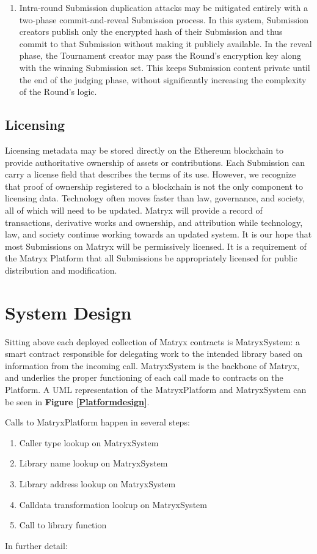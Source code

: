 \documentclass[a4paper, 10pt, conference]{ieeeconf}      %
\begin{document}
\begin{enumerate}
\item Intra-round Submission duplication attacks may be mitigated entirely with a two-phase commit-and-reveal Submission process. 
In this system, Submission creators publish only the encrypted hash of their Submission and thus commit to that Submission without making it publicly available.
In the reveal phase, the Tournament creator may pass the Round's encryption key along with the winning Submission set.
This keeps Submission content private until the end of the judging phase, without significantly increasing the complexity of the Round's logic.
\end{enumerate}

\subsection{Licensing}\label{licensing}
Licensing metadata may be stored directly on the Ethereum blockchain to provide authoritative ownership of assets or contributions. 
Each Submission can carry a license field that describes the terms of its use. 
However, we recognize that proof of ownership registered to a blockchain is not the only component to licensing data. 
Technology often moves faster than law, governance, and society, all of which will need to be updated. 
Matryx will provide a record of transactions, derivative works and ownership, and attribution while technology, law, and society continue working towards an updated system. 
It is our hope that most Submissions on Matryx will be permissively licensed. 
It is a requirement of the Matryx Platform that all Submissions be appropriately licensed for public distribution and modification.

\section{System Design}\label{systemdesign}

Sitting above each deployed collection of Matryx contracts is MatryxSystem: a smart contract responsible for delegating work to the intended library based on information from the incoming call. 
MatryxSystem is the backbone of Matryx, and underlies the proper functioning of each call made to contracts on the Platform. A UML representation of the MatryxPlatform and MatryxSystem can be seen in \textbf{Figure \ref{Platformdesign}}.

Calls to MatryxPlatform happen in several steps:
\begin{enumerate}
    \item Caller type lookup on MatryxSystem
    \item Library name lookup on MatryxSystem
    \item Library address lookup on MatryxSystem
    \item Calldata transformation lookup on MatryxSystem
    \item Call to library function
\end{enumerate}
\bigskip
In further detail:
\end{document}
